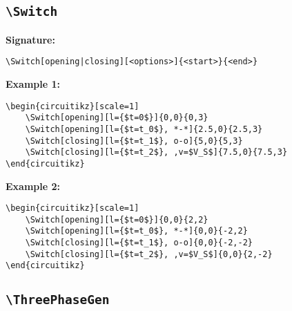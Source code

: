 \documentclass[a4paper,12pt]{article}
\begin{document}
\subsection{\texttt{\textbackslash Switch}}

\textbf{Signature:}
\begin{verbatim}
\Switch[opening|closing][<options>]{<start>}{<end>}
\end{verbatim}

\textbf{Example 1:}

\begin{lstlisting}[style=latexstyle]
\begin{circuitikz}[scale=1]
	\Switch[opening][l={$t=0$}]{0,0}{0,3}
	\Switch[opening][l={$t=t_0$}, *-*]{2.5,0}{2.5,3}
	\Switch[closing][l={$t=t_1$}, o-o]{5,0}{5,3}
	\Switch[closing][l={$t=t_2$}, ,v=$V_S$]{7.5,0}{7.5,3}
\end{circuitikz}
\end{lstlisting}


\begin{center}
\begin{circuitikz}[scale=1]
\end{circuitikz}
\end{center}

\textbf{Example 2:}

\begin{lstlisting}[style=latexstyle]
\begin{circuitikz}[scale=1]
	\Switch[opening][l={$t=0$}]{0,0}{2,2}
	\Switch[opening][l={$t=t_0$}, *-*]{0,0}{-2,2}
	\Switch[closing][l={$t=t_1$}, o-o]{0,0}{-2,-2}
	\Switch[closing][l={$t=t_2$}, ,v=$V_S$]{0,0}{2,-2}
\end{circuitikz}
\end{lstlisting}

\begin{center}
\begin{circuitikz}[scale=1]
\end{circuitikz}
\end{center}

\subsection{\texttt{\textbackslash ThreePhaseGen}}
\end{document}
